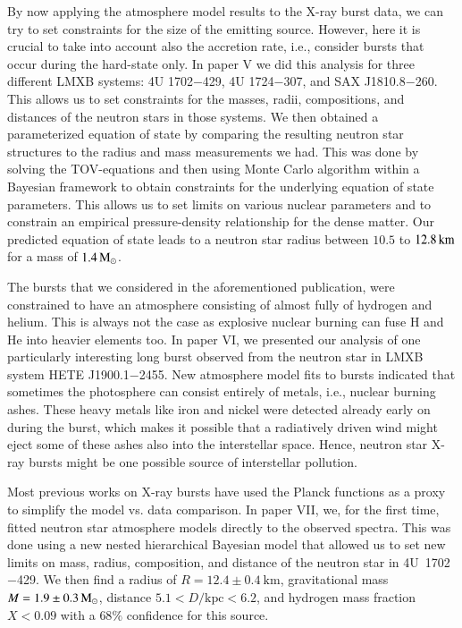 By now applying the atmosphere model results to the X-ray burst data, we can try to set constraints for the size of the emitting source.
However, here it is crucial to take into account also the accretion rate, i.e., consider bursts that occur during the hard-state only.
In paper V we did this analysis for three different LMXB systems: 4U 1702$-$429, 4U 1724$-$307, and SAX J1810.8$-$260. 
This allows us to set constraints for the masses, radii, compositions, and distances of the neutron stars in those systems.
We then obtained a parameterized equation of state by comparing the resulting neutron star structures to the radius and mass measurements we had.
This was done by solving the TOV-equations and then using Monte Carlo algorithm within a Bayesian framework to obtain constraints for the underlying equation of state parameters.
This allows us to set limits on various nuclear parameters and to constrain an empirical pressure-density relationship for the dense matter. 
Our predicted equation of state leads to a neutron star radius between $10.5$ to $12.8\, \mathrm{km}$ for a mass of $1.4\, \mathrm{M}_{\odot}$.  


The bursts that we considered in the aforementioned publication, were constrained to have an atmosphere consisting of almost fully of hydrogen and helium.
This is always not the case as explosive nuclear burning can fuse H and He into heavier elements too.
In paper VI, we presented our analysis of one particularly interesting long burst observed from the neutron star in LMXB system HETE J1900.1$-$2455. 
New atmosphere model fits to  bursts indicated that sometimes the photosphere can consist entirely of metals, i.e., nuclear burning ashes.
These heavy metals like iron and nickel were detected already early on during the burst, which makes it possible that a radiatively driven wind might eject some of these ashes also into the interstellar space.
Hence, neutron star X-ray bursts might be one possible source of interstellar pollution.

Most previous works on X-ray bursts have used the Planck functions as a proxy to simplify the model vs. data comparison.
In paper VII, we, for the first time, fitted neutron star atmosphere models directly to the observed spectra.
This was done using a new nested hierarchical Bayesian model that allowed us to set new limits on mass, radius, composition, and distance of the neutron star in 4U~1702$-$429. 
We then find a radius of $R = 12.4\pm 0.4~\mathrm{km}$, gravitational mass $M=1.9\pm 0.3\, \mathrm{M}_{\odot}$, distance $5.1 < D/\mathrm{kpc} < 6.2$, and hydrogen mass fraction $X < 0.09$ with a $68\%$ confidence for this source.




